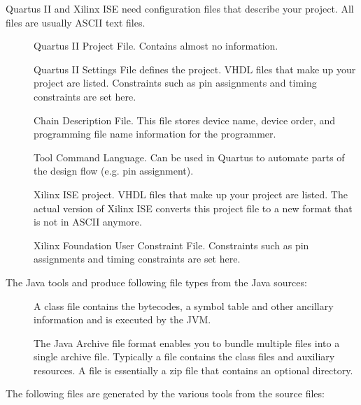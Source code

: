 Quartus II and Xilinx ISE need configuration files that describe
your project. All files are usually ASCII text files.

\begin{description}

\item[] Quartus II Project File. Contains almost no
information.
\item[] Quartus II Settings File defines the project.
    VHDL files that make up your project are listed. Constraints
    such as pin assignments and timing constraints are set here.
\item[] Chain Description File. This file
stores device name, device order, and programming file name
information for the programmer.
\item[] Tool Command Language. Can be used in Quartus to
automate parts of the design flow (e.g. pin assignment).

\item[] Xilinx ISE project. VHDL files that make up
    your project are listed. The actual version of Xilinx ISE
    converts this project file to a new format that is not in
    ASCII anymore.
\item[] Xilinx Foundation User Constraint File.
    Constraints such as pin assignments and timing constraints
    are set here.

\end{description}

The Java tools  and  produce following file types
from the Java sources:

\begin{description}

\item[] A class file contains the bytecodes, a symbol table and other
ancillary information and is executed by the JVM.

\item[] The Java Archive file format enables you to bundle multiple files
into a single archive file. Typically a  file contains
the class files and auxiliary resources. A  file is
essentially a zip file that contains an optional 
directory.

\end{description}

The following files are generated by the various tools from the
source files:


